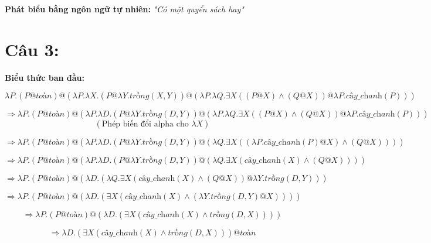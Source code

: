 \documentclass[a4paper, 15pt]{article}
\begin{document}
\textbf{Phát biểu bằng ngôn ngữ tự nhiên: } 
\textit{"Có một quyển sách hay"}

\vspace{10pt}

\section*{Câu 3:}

\textbf{Biểu thức ban đầu:}

\[
\lambda P. (P @ \textit{toàn}) @ 
\left( \lambda P. \lambda X. \left( P @ \lambda Y. \textit{trồng}(X, Y) \right) @ 
\left( \lambda P. \lambda Q. \exists X \left( (P @ X) \land (Q @ X) \right) @ \lambda P. \textit{cây\_chanh}(P) \right) \right)
\]

\[
\Rightarrow
\lambda P. (P @ \textit{toàn}) @ 
\left( \lambda P. \lambda D. \left( P @ \lambda Y. \textit{trồng}(D, Y) \right) @ 
\left( \lambda P. \lambda Q. \exists X \left( (P @ X) \land (Q @ X) \right) @ \lambda P. \textit{cây\_chanh}(P) \right) \right)
\]
\[
(\text{Phép biến đổi alpha cho } \lambda X)
\]

\[
\Rightarrow 
\lambda P. (P @ \textit{toàn}) @ 
\left( \lambda P. \lambda D. \left( P @ \lambda Y. \textit{trồng}(D, Y) \right) @ 
\left( \lambda Q. \exists X \left( (\lambda P. \textit{cây\_chanh}(P) @ X) \land (Q @ X) \right) 
\right) \right)
\]

\[
\Rightarrow 
\lambda P. (P @ \textit{toàn}) @ 
\left( \lambda P. \lambda D. \left( P @ \lambda Y. \textit{trồng}(D , Y) \right) @ 
\left( \lambda Q. \exists X \left( \textit{cây\_chanh}(X) \land (Q @ X) \right) 
\right) \right)
\]

\[
\Rightarrow
\lambda P. (P @ \textit{toàn}) @
\left( \lambda D. \left( \lambda Q. \exists X \left( \textit{cây\_chanh}(X) \land (Q @ X) \right) @ \lambda Y. \textit{trồng}(D, Y) \right) \right)
\]

\[
\Rightarrow
\lambda P. \left( P @ \textit{toàn} \right) @
(\lambda D. \left( \exists X \left( \textit{cây\_chanh}(X) \land \left( \lambda Y. \textit{trồng}(D, Y) @ X \right) \right) \right))
\]

\[
\Rightarrow
\lambda P. \left( P @ \textit{toàn} \right) @
(\lambda D. \left( \exists X \left( \textit{cây\_chanh}(X) \land \textit{trồng}(D, X) \right) \right))
\]

\[
\Rightarrow
\lambda D. \left( \exists X \left( \textit{cây\_chanh}(X) \land \textit{trồng}(D, X) \right) \right) @ \textit{toàn}
\]
\end{document}
